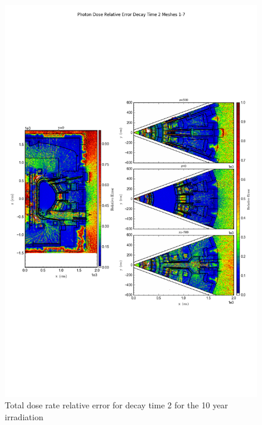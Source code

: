 \documentclass[12pt]{article}
\begin{document}
\begin{figure}[ht!]
\centering
\includegraphics[trim={0cm 8cm, 0cm 8cm},clip,scale=0.75]{../plots/final_model/10year/Photon_Dose_Relative_Error_Decay_Time_2_Meshes_1-7.png}
\caption{Total dose rate relative error for decay time 2 for the 10 year irradiation}
\label{fig:photons_10y_dc2_nob4c_relerr}
\end{figure}
\end{document}
